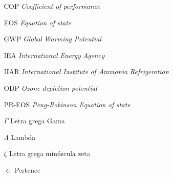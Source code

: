 \documentclass[
	12pt,				%
	openright,			%
	oneside,			%
	a4paper,			%
	english,			%
	french,				%
	spanish,			%
	brazil				%
	]{abntex2}
\begin{document}

\listoffigures*
{}
\cleardoublepage



\listoftables*
{}
\cleardoublepage

\begin{siglas}
  \item[COP] \textit{Coefficient of performance}
  \item[EOS] \textit{Equation of state}
  \item[GWP] \textit{Global Warming Potential}
  \item[IEA] \textit{International Energy Agency}
  \item[IIAR] \textit{International Institute of Ammonia Refrigeration}
  \item[ODP] \textit{Ozone depletion potential}
  \item[PR-EOS] \textit{Peng-Robinson Equation of state}
\end{siglas}

\mbox{}

\printnomenclature	
\pagebreak

\begin{simbolos}
\item[$ \Gamma $] Letra grega Gama
\item[$ \Lambda $] Lambda
\item[$ \zeta $] Letra grega minúscula zeta
\item[$ \in $] Pertence
\end{simbolos}

\tableofcontents*
\cleardoublepage




\mainmatter
\end{document}

